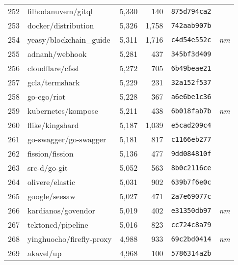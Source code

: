 {\begin{supertabular}{llrrll}
        252 &                 filhodanuvem/gitql &  5,330 &    140 &  \texttt{875d794ca2} &              \\
        253 &                docker/distribution &  5,326 &  1,758 &  \texttt{742aab907b} &              \\
        254 &            yeasy/blockchain\_guide &  5,311 &  1,716 &  \texttt{c4d54e552c} &  \textit{nm} \\
        255 &                     adnanh/webhook &  5,281 &    437 &  \texttt{345bf3d409} &              \\
        256 &                   cloudflare/cfssl &  5,272 &    705 &  \texttt{6b49beae21} &              \\
        257 &                     gcla/termshark &  5,229 &    231 &  \texttt{32a152f537} &              \\
        258 &                        go-ego/riot &  5,228 &    367 &  \texttt{a6e6be1c36} &              \\
        259 &                 kubernetes/kompose &  5,211 &    438 &  \texttt{6b018fab7b} &  \textit{nm} \\
        260 &                    flike/kingshard &  5,187 &  1,039 &  \texttt{e5cad209c4} &              \\
        261 &              go-swagger/go-swagger &  5,181 &    817 &  \texttt{c1166eb277} &              \\
        262 &                    fission/fission &  5,136 &    477 &  \texttt{9dd084810f} &              \\
        263 &                       src-d/go-git &  5,052 &    563 &  \texttt{8b0c2116ce} &              \\
        264 &                    olivere/elastic &  5,031 &    902 &  \texttt{639b7f6e0c} &              \\
        265 &                      google/seesaw &  5,027 &    471 &  \texttt{2a7e69077c} &              \\
        266 &                 kardianos/govendor &  5,019 &    402 &  \texttt{e31350db97} &  \textit{nm} \\
        267 &                  tektoncd/pipeline &  5,016 &    823 &  \texttt{cc724c8a79} &              \\
        268 &           yinghuocho/firefly-proxy &  4,988 &    933 &  \texttt{69c2bd0414} &  \textit{nm} \\
        269 &                          akavel/up &  4,968 &    100 &  \texttt{5786314a2b} &              \\

\end{supertabular}}
